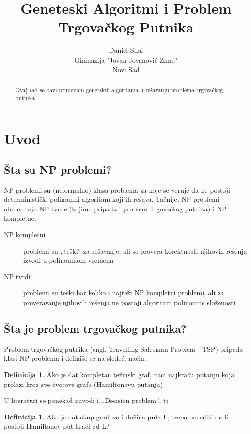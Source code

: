 \documentclass[titlepage]{article}
\theoremstyle{remark}
\theoremstyle{definition}
\newtheorem{df}[thm]{Definicija}
\begin{document}
	\title{\sc Geneteski Algoritmi i Problem Trgova\v{c}kog Putnika}

	\author{Daniel Sila\dj i\\
		Gimnazija "Jovan Jovanovi\'{c} Zmaj"\\
		Novi Sad}
	\maketitle

	\begin{abstract}
		Ovaj rad se bavi primenom genetskih algoritama u re\v{s}avanju problema trgova\v{c}kog putnika. \\
	\end{abstract}

	\section{Uvod}
        \subsection{\v{S}ta su NP problemi?}
    	NP problemi su (neformalno) klasa problema za koje se veruje da ne postoji deterministi\v{c}ki polinomni algoritam koji ih re\v{s}ava. Ta\v{c}nije, NP problemi obuhvataju NP tvrde (kojima pripada i problem Trgova\v{c}kog putnika) i NP kompletne.
        \begin{description}
          \item[NP kompletni] problemi su ,,te\v{s}ki'' za re\v{s}avanje, ali se provera korektnosti njihovih re\v{s}enja izvodi u polinomnom vremenu
          \item[NP tvrdi] problemi su te\v{s}ki bar koliko i najte\v{z}i NP kompletni problemi, ali za proveravanje njihovih re\v{s}enja ne postoji algoritam polinomne slo\v{z}enosti
        \end{description}
        \subsection{\v{S}ta je problem trgova\v{c}kog putnika?}
        Problem trgova\v{c}kog putnika (engl. Travelling Salesman Problem - TSP) pripada klasi NP problema i defini\v{s}e se na slede\'{c}i na\v{c}in:
         \begin{df}
        Ako je dat kompletan te\v{z}inski graf, naci najkra\'{c}u putanju koja prolazi kroz sve \v{c}vorove grafa (Hamiltonovu putanju)
        \end{df}
        U literaturi se ponekad navodi i ,,Decision problem'', tj
        \begin{df}
        Ako je dat skup gradova i du\v{z}ina puta L, treba odrediti da li postoji Hamiltonov put kra\'{c}i od L?
        \end{df}
\end{document}
